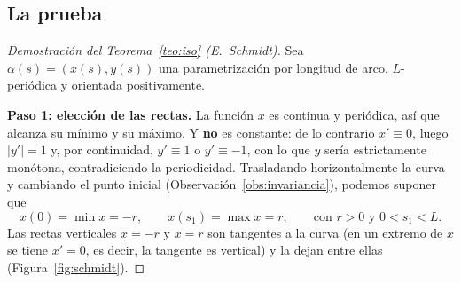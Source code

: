 \documentclass[12pt,a4paper]{article}
\theoremstyle{profesional}
\theoremstyle{definicion-style}
\newcommand{\abs}[1]{\left| #1 \right|}
\begin{document}
\subsection{La prueba}

\begin{proof}[Demostración del Teorema~\ref{teo:iso} (E.~Schmidt)]
    Sea \( \alpha(s) = (x(s), y(s)) \) una parametrización por longitud de arco, \( L \)-periódica y orientada positivamente.

    \textbf{Paso 1: elección de las rectas.}
    La función \( x \) es continua y periódica, así que alcanza su mínimo y su máximo. Y \textbf{no} es constante: de lo contrario \( x' \equiv 0 \), luego \( \abs{y'} = 1 \) y, por continuidad, \( y' \equiv 1 \) o \( y' \equiv -1 \), con lo que \( y \) sería estrictamente monótona,
    contradiciendo la periodicidad. Trasladando horizontalmente la curva y cambiando el punto inicial (Observación~\ref{obs:invariancia}), podemos suponer que
    \[
        x(0) = \min x = -r, \qquad x(s_1) = \max x = r, \qquad \text{con } r > 0 \text{ y } 0 < s_1 < L.
    \]
    Las rectas verticales \( x = -r \) y \( x = r \) son tangentes a la curva (en un extremo de \( x \) se tiene \( x' = 0 \), es decir, la tangente es vertical) y la dejan entre ellas (Figura~\ref{fig:schmidt}).


\end{proof}
\end{document}
